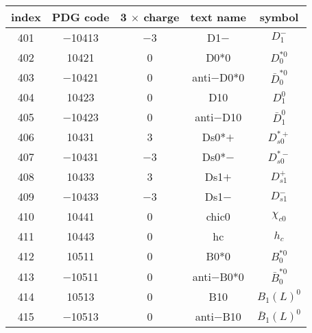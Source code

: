 \documentclass{article}
\begin{document}
\begin{table}[!htbp]
\centering
\begin{tabular}{|c|c|c|c|c|}
\hline
index & PDG code & 3 $\times$ charge & text name & symbol \\
\hline
401 & $-$10413 & $-$3 & D\underline{\hspace{0.6em}}1$-$ & $D_{1}^{-}$ \\
\hline
402 & 10421 & 0 & D\underline{\hspace{0.6em}}0*0 & $D_{0}^{*0}$ \\
\hline
403 & $-$10421 & 0 & anti$-$D\underline{\hspace{0.6em}}0*0 & $\bar{D}_{0}^{*0}$ \\
\hline
404 & 10423 & 0 & D\underline{\hspace{0.6em}}10 & $D_{1}^{0}$ \\
\hline
405 & $-$10423 & 0 & anti$-$D\underline{\hspace{0.6em}}10 & $\bar{D}_{1}^{0}$ \\
\hline
406 & 10431 & 3 & D\underline{\hspace{0.6em}}s0*$+$ & $D_{s0}^{*+}$ \\
\hline
407 & $-$10431 & $-$3 & D\underline{\hspace{0.6em}}s0*$-$ & $D_{s0}^{*-}$ \\
\hline
408 & 10433 & 3 & D\underline{\hspace{0.6em}}s1$+$ & $D_{s1}^{+}$ \\
\hline
409 & $-$10433 & $-$3 & D\underline{\hspace{0.6em}}s1$-$ & $D_{s1}^{-}$ \\
\hline
410 & 10441 & 0 & chi\underline{\hspace{0.6em}}c0 & $\chi_{c0}$ \\
\hline
411 & 10443 & 0 & h\underline{\hspace{0.6em}}c & $h_{c}$ \\
\hline
412 & 10511 & 0 & B\underline{\hspace{0.6em}}0*0 & $B_{0}^{*0}$ \\
\hline
413 & $-$10511 & 0 & anti$-$B\underline{\hspace{0.6em}}0*0 & $\bar{B}_{0}^{*0}$ \\
\hline
414 & 10513 & 0 & B\underline{\hspace{0.6em}}10 & $B_{1}(L)^{0}$ \\
\hline
415 & $-$10513 & 0 & anti$-$B\underline{\hspace{0.6em}}10 & $\bar{B}_{1}(L)^{0}$ \\

\end{tabular}
\end{table}
\end{document}
